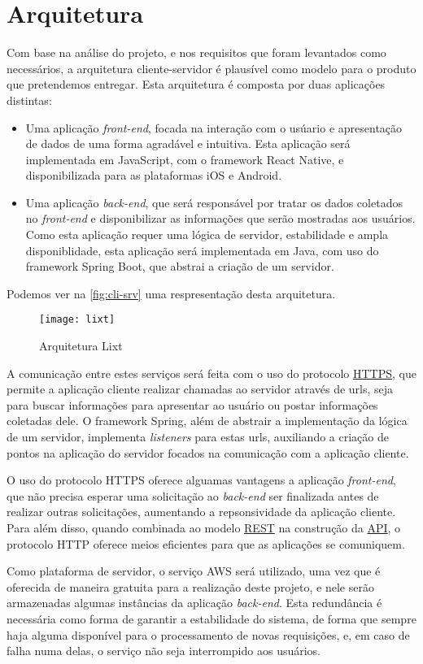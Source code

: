 \section{Arquitetura}

Com base na análise do projeto, e nos requisitos que foram levantados
como necessários, a arquitetura cliente-servidor é plausível como
modelo para o produto que pretendemos entregar.
Esta arquitetura é composta por duas aplicações distintas:
\begin{itemize}
\item Uma aplicação \emph{front-end}, focada na interação com o usúario
  e apresentação de dados de uma forma agradável e intuitiva. Esta
  aplicação será implementada em JavaScript, com o framework React
  Native, e disponibilizada para as plataformas iOS e Android.
\item Uma aplicação \emph{back-end}, que será responsável por tratar os
  dados coletados no \emph{front-end} e disponibilizar as informações
  que serão mostradas aos usuários. Como esta aplicação requer uma
  lógica de servidor, estabilidade e ampla disponiblidade, esta
  aplicação será implementada em Java, com uso do framework Spring
  Boot, que abstrai a criação de um servidor.
\end{itemize}
Podemos ver na \autoref{fig:cli-srv} uma respresentação desta
arquitetura.

\begin{figure}[h]
  \centering
  \texttt{[image: lixt]}
  \caption{Arquitetura Lixt}
  \label{fig:cli-srv}
\end{figure}

A comunicação entre estes serviços será feita com o uso do protocolo
\label{sig:https}\hyperlink{s:http}{HTTPS}, que permite a aplicação
cliente realizar chamadas ao servidor através de urls, seja para
buscar informações para apresentar ao usuário ou postar informações
coletadas dele. O framework Spring, além de abstrair a implementação
da lógica de um servidor, implementa \emph{listeners} para estas urls,
auxiliando a criação de pontos na aplicação do servidor focados na
comunicação com a aplicação cliente.

O uso do protocolo HTTPS oferece alguamas vantagens a aplicação
\emph{front-end}, que não precisa esperar uma solicitação ao
\emph{back-end} ser finalizada antes de realizar outras solicitações,
aumentando a repsonsividade da aplicação cliente. Para além disso,
quando combinada ao modelo \label{sig:rest}\hyperlink{s:rest}{REST} na
construção da \label{sig:API} \hyperlink{s:API}{API}, o protocolo HTTP
oferece meios eficientes para que as aplicações se comuniquem.

Como plataforma de servidor, o serviço AWS será utilizado, uma vez que
é oferecida de maneira gratuita para a realização deste projeto, e nele
serão armazenadas algumas instâncias da aplicação \emph{back-end}.
Esta redundância é necessária como forma de garantir a estabilidade do
sistema, de forma que sempre haja alguma disponível para o
processamento de novas requisições, e, em caso de falha numa delas, o
serviço não seja interrompido aos usuários.


